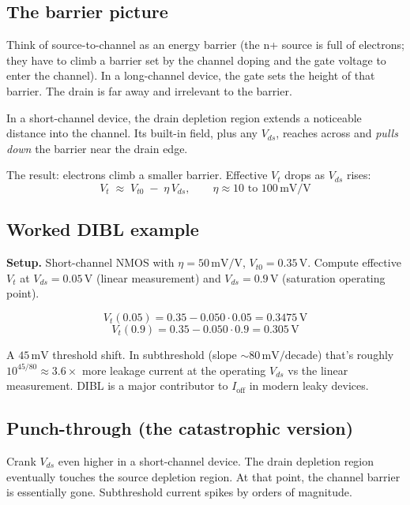 \documentclass[11pt]{article}
\begin{document}
\subsection{The barrier picture}

Think of source-to-channel as an energy barrier (the n+ source is full of electrons; they have to climb a barrier set by the channel doping and the gate voltage to enter the channel). In a long-channel device, the gate sets the height of that barrier. The drain is far away and irrelevant to the barrier.

In a short-channel device, the drain depletion region extends a noticeable distance into the channel. Its built-in field, plus any $V_{ds}$, reaches across and \emph{pulls down} the barrier near the drain edge.

The result: electrons climb a smaller barrier. Effective $V_t$ drops as $V_{ds}$ rises:
\begin{equation}
V_t \;\approx\; V_{t0} \;-\; \eta\, V_{ds}, \qquad \eta \approx 10 \text{ to } 100\,\text{mV/V}
\end{equation}

\subsection{Worked DIBL example}

\textbf{Setup.} Short-channel NMOS with $\eta = 50\,\text{mV/V}$, $V_{t0} = 0.35\,\text{V}$. Compute effective $V_t$ at $V_{ds} = 0.05\,\text{V}$ (linear measurement) and $V_{ds} = 0.9\,\text{V}$ (saturation operating point).

\[
V_t(0.05) = 0.35 - 0.050 \cdot 0.05 = 0.3475\,\text{V}
\]
\[
V_t(0.9) = 0.35 - 0.050 \cdot 0.9 = 0.305\,\text{V}
\]

A $45\,\text{mV}$ threshold shift. In subthreshold (slope $\sim 80\,\text{mV/decade}$) that's roughly $10^{45/80} \approx 3.6\times$ more leakage current at the operating $V_{ds}$ vs the linear measurement. DIBL is a major contributor to $I_{\text{off}}$ in modern leaky devices.

\subsection{Punch-through (the catastrophic version)}

Crank $V_{ds}$ even higher in a short-channel device. The drain depletion region eventually touches the source depletion region. At that point, the channel barrier is essentially gone. Subthreshold current spikes by orders of magnitude.
\end{document}
